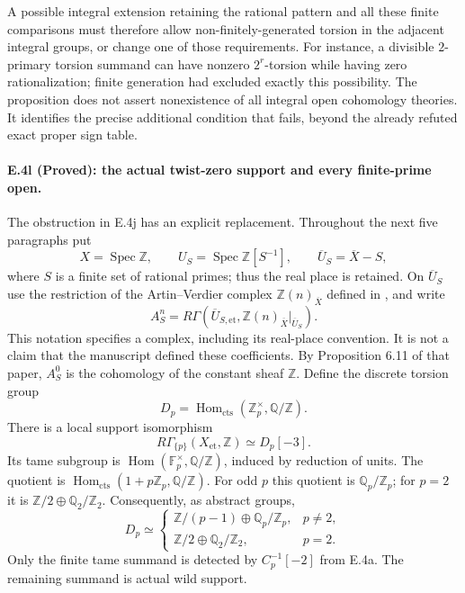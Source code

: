 A possible integral extension retaining the rational pattern and all
these finite comparisons must therefore allow non-finitely-generated
torsion in the adjacent integral groups, or change one of those
requirements. For instance, a divisible $2$-primary torsion summand
can have nonzero $2^r$-torsion while having zero rationalization;
finite generation had excluded exactly this possibility.
The proposition does not assert nonexistence of all integral open
cohomology theories. It identifies the precise additional condition
that fails, beyond the already refuted exact proper sign table.


\paragraph{E.4l (Proved): the actual twist-zero support and every finite-prime open.}
The obstruction in E.4j has an explicit replacement. Throughout the next
five paragraphs put
\[
 X=\operatorname{Spec}\mathbb Z,\qquad
 U_S=\operatorname{Spec}\mathbb Z[S^{-1}],\qquad
 \overline U_S=\overline X-S,
\]
where $S$ is a finite set of rational primes; thus the real place is
retained. On $\overline U_S$ use the restriction of the Artin--Verdier
complex $\mathbb Z(n)_{\overline X}$ defined in
\citet[\S6.2 and Definition 6.5]{D_FlachMorin2018}, and write
\[
 A_S^n=R\Gamma(\overline U_{S,\mathrm{et}},
                     \mathbb Z(n)_{\overline X}|_{\overline U_S}).
\]
This notation specifies a complex, including its real-place convention.
It is not a claim that the manuscript defined these coefficients.
By Proposition 6.11 of that paper, $A_S^0$ is the cohomology of the
constant sheaf $\mathbb Z$. Define the discrete torsion group
\[
 D_p=\operatorname{Hom}_{\mathrm{cts}}
                   (\mathbb Z_p^\times,\mathbb Q/\mathbb Z).
\]
There is a local support isomorphism
\[
 R\Gamma_{\{p\}}(X_{\mathrm{et}},\mathbb Z)\simeq D_p[-3].
 \tag{E.4.13}
\]
Its tame subgroup is
$\operatorname{Hom}(\mathbb F_p^\times,\mathbb Q/\mathbb Z)$, induced by
reduction of units. The quotient is
$\operatorname{Hom}_{\mathrm{cts}}(1+p\mathbb Z_p,\mathbb Q/\mathbb Z)$.
For odd $p$ this quotient is $\mathbb Q_p/\mathbb Z_p$; for $p=2$ it is
$\mathbb Z/2\oplus\mathbb Q_2/\mathbb Z_2$.
Consequently, as abstract groups,
\[
 D_p\simeq
 \begin{cases}
  \mathbb Z/(p-1)\oplus\mathbb Q_p/\mathbb Z_p,&p\ne2,\\
  \mathbb Z/2\oplus\mathbb Q_2/\mathbb Z_2,&p=2.
 \end{cases}
 \tag{E.4.14}
\]
Only the finite tame summand is detected by
$C_p^{-1}[-2]$ from E.4a. The remaining summand is actual wild support.

